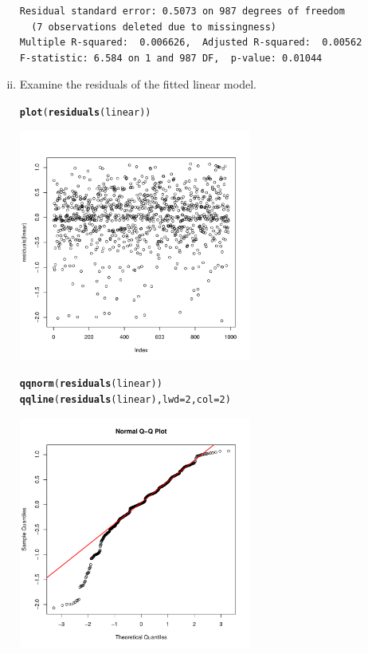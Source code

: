 \documentclass[12pt,a4paper]{article}\usepackage[]{graphicx}\usepackage[]{color}
\makeatletter
\newcommand{\hlnum}[1]{\textcolor[rgb]{0.686,0.059,0.569}{#1}}%
\newcommand{\hlstd}[1]{\textcolor[rgb]{0.345,0.345,0.345}{#1}}%
\newcommand{\hlkwc}[1]{\textcolor[rgb]{0.333,0.667,0.333}{#1}}%
\newcommand{\hlkwd}[1]{\textcolor[rgb]{0.737,0.353,0.396}{\textbf{#1}}}%
\newenvironment{kframe}{%
 \def\at@end@of@kframe{}%
 \ifinner\ifhmode%
  \def\at@end@of@kframe{\end{minipage}}%
  \begin{minipage}{\columnwidth}%
 \fi\fi%
 \def\FrameCommand##1{\hskip\@totalleftmargin \hskip-\fboxsep
 \colorbox{shadecolor}{##1}\hskip-\fboxsep
     \hskip-\linewidth \hskip-\@totalleftmargin \hskip\columnwidth}%
 \MakeFramed {\advance\hsize-\width
   \@totalleftmargin\z@ \linewidth\hsize
   \@setminipage}}%
 {\par\unskip\endMakeFramed%
 \at@end@of@kframe}
\newenvironment{knitrout}{}{} %
\makeatother
\begin{document}
\begin{enumerate}[(i)]
\begin{knitrout}
\begin{kframe}
\begin{verbatim}
Residual standard error: 0.5073 on 987 degrees of freedom
  (7 observations deleted due to missingness)
Multiple R-squared:  0.006626,	Adjusted R-squared:  0.00562 
F-statistic: 6.584 on 1 and 987 DF,  p-value: 0.01044
\end{verbatim}
\end{kframe}
\end{knitrout}
\item Examine the residuals of the fitted linear model.
\begin{knitrout}
\color{fgcolor}\begin{kframe}
\begin{alltt}
\hlkwd{plot}\hlstd{(}\hlkwd{residuals}\hlstd{(linear))}
\end{alltt}
\end{kframe}

{\centering \includegraphics[width=0.6\textwidth]{figure/unnamed-chunk-4-1} 

}


\begin{kframe}\begin{alltt}
\hlkwd{qqnorm}\hlstd{(}\hlkwd{residuals}\hlstd{(linear))}
\hlkwd{qqline}\hlstd{(}\hlkwd{residuals}\hlstd{(linear),} \hlkwc{lwd} \hlstd{=} \hlnum{2}\hlstd{,} \hlkwc{col} \hlstd{=} \hlnum{2}\hlstd{)}
\end{alltt}
\end{kframe}

{\centering \includegraphics[width=0.6\textwidth]{figure/unnamed-chunk-4-2} 

}
\end{knitrout}
\end{enumerate}
\end{document}
